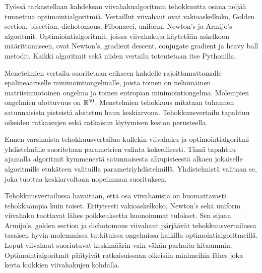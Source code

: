 \documentclass[english, 12pt, a4paper, sci, utf8, a-1b, online, table]{aaltothesis}
\newcommand{\R}{\ensuremath\mathbb{R}}
\begin{document}
\newpage

\begin{abstractpage}[finnish]
  Työssä tarkastellaan kahdeksan viivahakualgoritmin tehokkuutta osana neljää tunnettua optimointialgoritmiä. Vertaillut viivahaut ovat vakioaskelkoko, Golden section, bisection, dichotomous, Fibonacci, uniform, Newton's ja Armijo's algoritmit. Optimiointialgoritmit, joissa viivahakuja käytetään askelkoon määrittämiseen, ovat Newton's, gradient descent, conjugate gradient ja heavy ball metodit. Kaikki algoritmit sekä niiden vertailu toteutetaan itse Pythonilla.
  
  Menetelmien vertailu suoritetaan erikseen kahdelle rajoittamattomalle epälineaariselle minimointiongelmalle, joista toinen on neliömäinen matriisimuotoinen ongelma ja toinen entropian minimointiongelma. Molempien ongelmien ulottuvuus on $\R^{50}$. Menetelmien tehokkuus mitataan tuhannen satunnaisista pisteistä aloitetun haun keskiarvona. Tehokkuusvertailu tapahtuu oikeiden ratkaisujen sekä ratkaisun löytymisen keston perusteella.
  
  Ennen varsinaista tehokkuusvertailua kullekin viivahaku ja optimointialgoritmi yhdistelmälle suoritetaan parametrien valinta kokeellisesti. Tämä tapahtuu ajamalla algoritmit kymmenestä satunnaisesta alkupisteestä alkaen jokaiselle algoritmille etukäteen valituilla parametriyhdistelmillä. Yhdistelmistä valitaan se, joka tuottaa keskiarvoltaan nopeimman suorituksen.
  
  Tehokkuusvertailussa havaitaan, että osa viivahauista on huomattavasti tehokkaampia kuin toiset. Erityisesti vakioaskelkoko, Newton's sekä uniform viivahaku tuottavat lähes poikkeuksetta huonoimmat tulokset. Sen sijaan Armijo's, golden section ja dichotomous viivahaut pärjäävät tehokkuusvertailussa tasaisen hyvin molemmissa tutkituissa ongelmissa kaikilla optimointialgoritmeillä. Loput viivahaut suoriutuvat keskimäärin vain vähän parhaita hitaammin. Optimointialgoritmit päätyivät ratkaisuissaan oikeisiin minimeihin lähes joka kerta kaikkien viivahakujen kohdalla.
  

\end{abstractpage}
\end{document}
